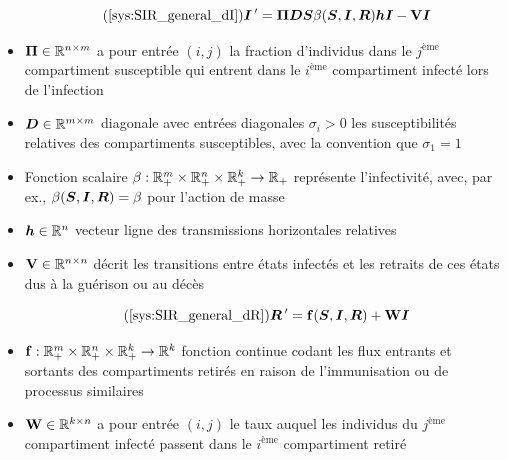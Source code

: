 \documentclass[aspectratio=169]{beamer}\usepackage[]{graphicx}\usepackage[]{xcolor}
\begin{document}
\begin{frame}
\begin{equation}\tag{\ref{sys:SIR_general_dI}}
\bI\pprime = \bPi\bD\bS\beta(\bS,\bI,\bR)\bh\bI-\mathbf{V}\bI
\end{equation}
\begin{itemize}
\item $\bm{\Pi}\in\mathbb{R}^{n\times m}$ a pour entrée $(i,j)$ la fraction d'individus dans le $j^{\textrm{ème}}$ compartiment susceptible qui entrent dans le $i^{\textrm{ème}}$ compartiment infecté lors de l'infection
\item $\bm{D}\in\mathbb{R}^{m\times m}$ diagonale avec entrées diagonales $\sigma_i>0$ les susceptibilités relatives des compartiments susceptibles, avec la convention que $\sigma_1=1$
\item Fonction scalaire $\beta:\mathbb{R}_+^m\times\mathbb{R}_+^n\times\mathbb{R}_+^k\to\mathbb{R}_+$ représente l'infectivité, avec, par ex., $\beta(\bm{S},\bm{I},\bm{R})=\beta$ pour l'action de masse
\item $\bm{h}\in\mathbb{R}^{n}$ vecteur ligne des transmissions horizontales relatives
\item $\mathbf{V}\in\mathbb{R}^{n\times n}$ décrit les transitions entre états infectés et les retraits de ces états dus à la guérison ou au décès
\end{itemize}
\end{frame}  


\begin{frame}
\begin{equation}\tag{\ref{sys:SIR_general_dR}}
\bR\pprime = \mathbf{f}(\bS,\bI,\bR)+\mathbf{W}\bI
\end{equation}
\begin{itemize}
\item $\mathbf{f}:\mathbb{R}_+^m\times\mathbb{R}_+^n\times\mathbb{R}_+^k\to \mathbb{R}^k$ fonction continue codant les flux entrants et sortants des compartiments retirés en raison de l'immunisation ou de processus similaires
\item $\mathbf{W}\in\mathbb{R}^{k\times n}$ a pour entrée $(i,j)$ le taux auquel les individus du $j^{\textrm{ème}}$ compartiment infecté passent dans le $i^{\textrm{ème}}$ compartiment retiré
\end{itemize}
\end{frame}
\end{document}
